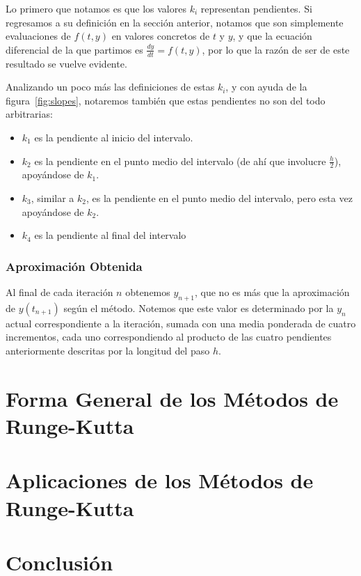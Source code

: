 \documentclass[12pt, a4paper]{article}
\begin{document}
Lo primero que notamos es que los valores \(k_{i}\) representan pendientes. Si regresamos a su definición en la sección anterior, notamos que son simplemente evaluaciones de \(f(t,y)\) en valores concretos de \(t\) y \(y\), y que la ecuación diferencial de la que partimos es \(\frac{dy}{dt} = f(t, y)\), por lo que la razón de ser de este resultado se vuelve evidente.

Analizando un poco más las definiciones de estas \(k_{i}\), y con ayuda de la figura~\ref{fig:slopes}, notaremos también que estas pendientes no son del todo arbitrarias:
\begin{itemize}
	\item \(k_{1}\) es la pendiente al inicio del intervalo.
	\item \(k_{2}\) es la pendiente en el punto medio del intervalo (de ahí que involucre \(\frac{h}{2}\)), apoyándose de \(k_{1}\).
	\item \(k_{3}\), similar a \(k_{2}\), es la pendiente en el punto medio del intervalo, pero esta vez apoyándose de \(k_{2}\).
	\item \(k_{4}\) es la pendiente al final del intervalo
\end{itemize}

\subsubsection{Aproximación Obtenida}

Al final de cada iteración \(n\) obtenemos \(y_{n+1}\), que no es más que la aproximación de \(y(t_{n+1})\) según el método. Notemos que este valor es determinado por la \(y_{n}\) actual correspondiente a la iteración, sumada con una media ponderada de cuatro incrementos, cada uno correspondiendo al producto de las cuatro pendientes anteriormente descritas por la longitud del paso \(h\).

\section{Forma General de los Métodos de Runge-Kutta}

\section{Aplicaciones de los Métodos de Runge-Kutta}

\section{Conclusión}
\end{document}
